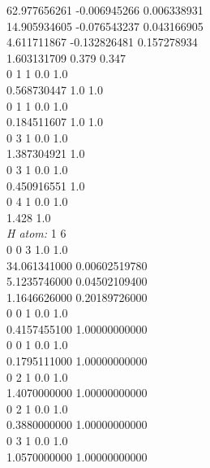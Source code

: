 \documentclass[11pt,DIV=13,BCOR=5mm,a4paper,headinclude]{scrbook}
\begin{document}
\begin{spacing}{0.5}
{62.977656261     -0.006945266     0.006338931\\

14.905934605     -0.076543237     0.043166905\\

4.611711867      -0.132826481     0.157278934\\

1.603131709       0.379           0.347\\
0 1 1 0.0 1.0\\

0.568730447       1.0             1.0\\
0 1 1 0.0 1.0\\

0.184511607       1.0             1.0\\
0 3 1 0.0 1.0\\

1.387304921       1.0\\
0 3 1 0.0 1.0\\

0.450916551       1.0\\
0 4 1 0.0 1.0\\

1.428             1.0\\

\textit{H atom: }
1 6\\
0 0 3 1.0 1.0\\


34.061341000 0.00602519780\\

5.1235746000 0.04502109400\\

1.1646626000 0.20189726000\\
0 0 1 0.0 1.0\\

0.4157455100 1.00000000000\\
0 0 1 0.0 1.0\\

0.1795111000 1.00000000000\\
0 2 1 0.0 1.0\\

1.4070000000 1.00000000000\\
0 2 1 0.0 1.0\\

0.3880000000 1.00000000000\\
0 3 1 0.0 1.0\\

1.0570000000 1.00000000000\\}
 \end{spacing}
 
\end{document}

